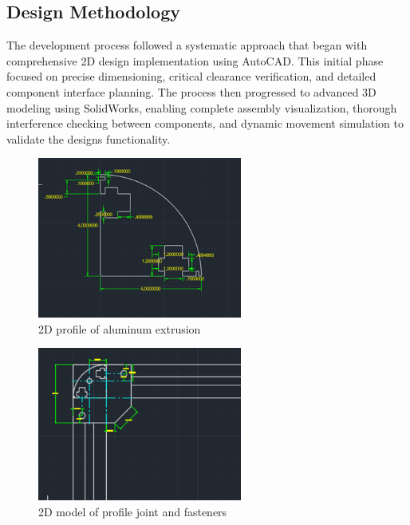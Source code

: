 \documentclass[../../main]{subfiles}
\begin{document}
\subsection{Design Methodology}\label{design-methodology}

The development process followed a systematic approach that began with
comprehensive 2D design implementation using AutoCAD. This initial phase
focused on precise dimensioning, critical clearance verification, and
detailed component interface planning. The process then progressed to
advanced 3D modeling using SolidWorks, enabling complete assembly
visualization, thorough interference checking between components, and
dynamic movement simulation to validate the design\textquotesingle s
functionality.

\begin{figure}[h!]
  \centering
  \includegraphics[width=0.6\textwidth]{img/image114.png}
  \caption{2D profile of aluminum extrusion}
  \end{figure}

  \begin{figure}[h!]
    \centering
    \includegraphics[width=0.6\textwidth]{img/image116.png}
    \caption{2D model of profile joint and fasteners}
    \end{figure}
\end{document}
